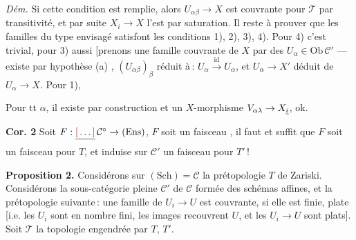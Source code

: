 \documentclass[11pt,a4paper]{article}
\begin{document}
\emph{Dém.} Si cette condition est remplie, alors $U_{\alpha\beta} \to X$ est
couvrante pour $\mathcal{T}$ par transitivité, et par suite $X_i \to X$ l'est
par saturation. Il reste à prouver que les familles du type envisagé
satisfont les conditions 1), 2), 3), 4). Pour 4) c'est trivial, pour 3)
aussi [prenons une famille couvrante 
 de $X$ par des $U_\alpha \in \mathrm{Ob}\,\mathcal{C}'$
--- existe par hypothèse (a) , $(U_{\alpha\beta})_\beta$ réduit à\,:
$U_\alpha \xrightarrow{\mathrm{id}} U_\alpha$, et $U_\alpha \to X'$ déduit de
$U_\alpha \to X$. Pour 1),


 Pour tt $\alpha$, il existe par construction
  et un $X$-morphisme
 $V_{\alpha\lambda} \to X_{\uncertain{i}}$,
ok.

\textbf{Cor. 2} Soit $F : \struck{\ill{}}\,\mathcal{C}^{\circ} \to
(\mathrm{Ens})$,  $F$ soit un faisceau
, il faut et suffit que $F$ \struck{\ill{} \ill{}
\ill{}} soit un faisceau pour $T$, et \struck{\ill{}} induise sur
$\mathcal{C}'$ un faisceau pour $T'$\,!


\textbf{Proposition 2.} Considérons sur $(\mathrm{Sch}) = \mathcal{C}$ la
prétopologie $T$ de Zariski. Considérons la \struck{\ill{}} sous-catégorie
pleine $\mathcal{C}'$ de $\mathcal{C}$ formée des schémas affines, et la
prétopologie suivante\,: une famille de $U_i \to U$ est couvrante, si elle
est finie,  \struck{\ill{}} plate [i.e. les $U_i$ sont en
nombre fini, les images recouvrent $U$, et les $U_i \to U$ sont plats]. Soit
$\mathcal{T}$ la topologie  engendrée par $T$, $T'$.

\end{document}
